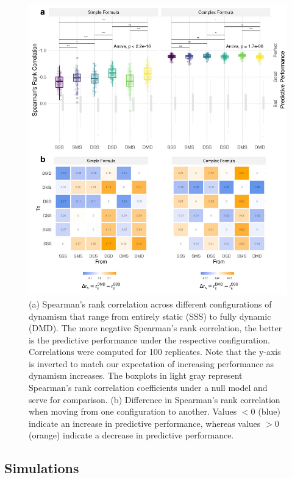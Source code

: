 \documentclass[../FinalThesis.tex]{subfiles}
\begin{document}
\begin{figure}[htpb]
 \begin{center}
  \includegraphics[width = \textwidth]{Figures/RankCorrelation.pdf}
  \caption{(a) Spearman's rank correlation across different configurations of
  dynamism that range from entirely static (SSS) to fully dynamic (DMD). The
  more negative Spearman's rank correlation, the better is the predictive
  performance under the respective configuration. Correlations were computed for
  100 replicates. Note that the y-axis is inverted to match our expectation of
  increasing performance as dynamism increases. The boxplots in light gray
  represent Spearman's rank correlation coefficients under a null model and
  serve for comparison. (b) Difference in Spearman's rank correlation when
  moving from one configuration to another. Values $< 0$ (blue) indicate an
  increase in predictive performance, whereas values $> 0$ (orange) indicate a
  decrease in predictive performance.}
  \label{RankCorrelation}
 \end{center}
\end{figure}

\subsection{Simulations}
\end{document}
